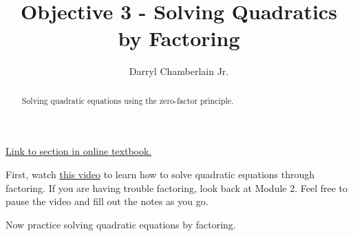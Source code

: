 \documentclass{ximera}
\author{Darryl Chamberlain Jr.}
\title{Objective 3 - Solving Quadratics by Factoring}
\begin{document}
\begin{abstract}
Solving quadratic equations using the zero-factor principle.
\end{abstract}
\maketitle

\href{https://cnx.org/contents/mwjClAV_@8.1:-Sm9he1Q@17/Quadratic-Functions}{Link to section in online textbook.}


First, watch \underline{\href{https://mediasite.video.ufl.edu/Mediasite/Play/3b62004c61964849bdaa95a9cec047531d}{this video}} to learn how to solve quadratic equations through factoring. If you are having trouble factoring, look back at Module 2. Feel free to pause the video and fill out the notes as you go. 

Now practice solving quadratic equations by factoring. 
\end{document}
